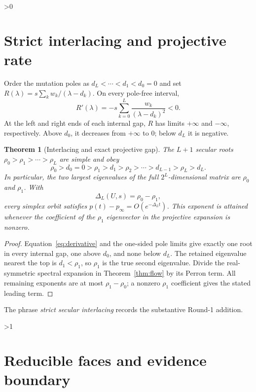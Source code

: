 \documentclass[10pt]{article}
\providecommand{\CRevisionRound}{2}
\newtheorem{theorem}{Theorem}
\begin{document}
\ifnum\CRevisionRound>0
\section{Strict interlacing and projective rate}

Order the mutation poles as $d_L<\cdots<d_1<d_0=0$ and set
$R(\lambda)=s\sum_kw_k/(\lambda-d_k)$.  On every pole-free interval,
\begin{equation}\label{eq:derivative}
 R'(\lambda)=-s\sum_{k=0}^L\frac{w_k}{(\lambda-d_k)^2}<0.
\end{equation}
At the left and right ends of each internal gap, $R$ has limits $+\infty$
and $-\infty$, respectively.  Above $d_0$, it decreases from $+\infty$ to
$0$; below $d_L$ it is negative.

\begin{theorem}[Interlacing and exact projective gap]\label{thm:gap}
The $L+1$ secular roots $\rho_0>\rho_1>\cdots>\rho_L$ are simple and obey
\begin{equation}\label{eq:interlace}
 \rho_0>d_0=0>\rho_1>d_1>\rho_2>\cdots>d_{L-1}>\rho_L>d_L.
\end{equation}
In particular, the two largest eigenvalues of the full $2^L$-dimensional
matrix are $\rho_0$ and $\rho_1$.  With
\begin{equation}\label{eq:gap}
 \Delta_L(U,s)=\rho_0-\rho_1,
\end{equation}
every simplex orbit satisfies
$p(t)-p_\infty=O(e^{-\Delta_Lt})$.  This exponent is attained whenever the
coefficient of the $\rho_1$ eigenvector in the projective expansion is
nonzero.
\end{theorem}

\begin{proof}
Equation~\eqref{eq:derivative} and the one-sided pole limits give exactly one
root in every internal gap, one above $d_0$, and none below $d_L$.  The
retained eigenvalue nearest the top is $d_1<\rho_1$, so $\rho_1$ is the true
second eigenvalue.  Divide the real-symmetric spectral expansion in
Theorem~\ref{thm:flow} by its Perron term.  All remaining exponents are at most
$\rho_1-\rho_0$; a nonzero $\rho_1$ coefficient gives the stated leading
term.
\end{proof}

The phrase \emph{strict secular interlacing} records the substantive Round-1
addition.
\fi

\ifnum\CRevisionRound>1
\section{Reducible faces and evidence boundary}
\end{document}
